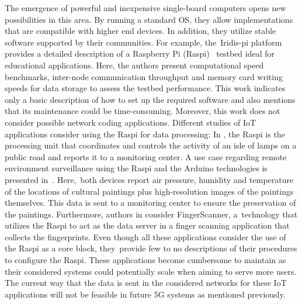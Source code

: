 \documentclass[electronics,article,accept,moreauthors,pdftex,10pt,a4paper]{mdpi}
\theoremstyle{mdpi}
\newcounter{ex}
\newcounter{re}
\theoremstyle{mdpidefinition}
\begin{document}
The emergence of powerful and inexpensive single-board computers opens new possibilities in this area. By running a standard OS, they allow implementations that are compatible with higher end devices. In addition, they utilize stable software supported by their communities. For example, the~Iridis-pi platform \cite{cox2014iridis} provides a detailed description of a Raspberry Pi (Raspi)~\cite{making_of_pi} testbed ideal for educational applications. Here, the authors present computational speed benchmarks, inter-node communication throughput and memory card writing speeds for data storage to assess the testbed performance. This work indicates only a basic description of how to set up the required software and also mentions that its maintenance could be time-consuming. Moreover, this work does not consider possible network coding applications. Different studies of IoT applications consider using the Raspi for data processing: In \cite{leccese2014smartcity}, the Raspi is the processing unit that coordinates and controls the activity of an isle of lamps on a public road and reports it to a monitoring center. A use case regarding remote environment surveillance using the Raspi and the Arduino \cite{arduino} technologies is presented in~\cite{leccese2014newimaging}. Here,~both devices report air pressure, humidity and temperature of the locations of cultural paintings plus high-resolution images of the paintings themselves. This data is sent to a monitoring center to ensure the preservation of the paintings. Furthermore, authors in \cite{sapes2016finger} consider FingerScanner, a~technology that utilizes the Raspi to act as the data server in a finger scanning application that collects the fingerprints. Even though all these applications consider the use of the Raspi as a core block, they~provide few to no descriptions of their procedures to configure the Raspi. These applications become cumbersome to maintain as their considered systems could potentially scale when aiming to serve more users. The current way that the data is sent in the considered networks for these IoT applications will not be feasible in future 5G systems as mentioned previously.
\end{document}
